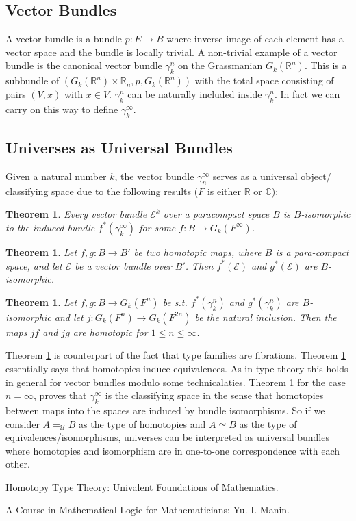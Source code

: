 \documentclass[10pt]{article}
\theoremstyle{definition}
\theoremstyle{plain}
\newtheorem{theorem}[definition]{Theorem}
\theoremstyle{remark}
\newcommand{\U}{\mathscr{U}}
\begin{document}
\subsection{Vector Bundles}
A vector bundle is a bundle $p : E \to B$ where inverse image of each element has a 
vector space and the bundle is locally trivial. A non-trivial example of a vector bundle is 
the canonical vector bundle $\gamma^n_k$ on the Grassmanian $G_k(\mathbb{R}^n)$. This is a 
subbundle of $(G_k(\mathbb{R}^n) \times \mathbb{R}_n,p,G_k(\mathbb{R}^n))$ with the total
space consisting of pairs $(V,x)$ with $x\in V$. $\gamma^n_k$ can be naturally included 
inside $\gamma^n_k$. In fact we can carry on this way to define $\gamma^{\infty}_k$. 

\subsection{Universes as Universal Bundles}

Given a natural number $k$, the vector bundle $\gamma^{\infty }_n$ serves as a universal object/
classifying space due to the following results ($F$ is either $\mathbb{R}$ or $\mathbb{C}$):

\begin{theorem}\label{T:Ind}
Every vector bundle $\mathscr{E}^k$ over a paracompact space $B$ is $B$-isomorphic
to the induced bundle $f^*(\gamma^{\infty}_k)$ for some ${f : B \to G_k (F^{ \infty })}$.
\end{theorem}

\begin{theorem}\label{T:Hom to Eq}
Let $f, g: B \to B'$ be two homotopic maps, where $B$ is a para-compact space, 
and let $\mathscr{E}$ be a vector bundle over $B'$. Then $f^*(\mathscr{E})$ and 
$g^*(\mathscr{E})$ are $B$-isomorphic.
\end{theorem}

\begin{theorem}\label{T:Eq to Hom}
Let $f, g: B \to G_k(F^n)$ be s.t. $f^*(\gamma_k^n)$ and $g^*(\gamma_k^n)$
are $B$-isomorphic and let ${ j: G_k(F^n) \to G_k(F^{2n}) }$ be the natural inclusion. Then the
maps $jf$ and $jg$ are homotopic for $1 \leq n \leq \infty$. 
\end{theorem}

Theorem \ref{T:Ind} is counterpart of the fact that type families are fibrations. Theorem
\ref{T:Hom to Eq} essentially says that homotopies induce equivalences. As in type theory
this holds in general for vector bundles modulo some technicalaties. Theorem \ref{T:Eq to Hom}
for the case $n = \infty$, proves that $\gamma^{\infty}_k$ is the classifying space in the 
sense that homotopies between maps into the spaces are induced by bundle isomorphisms.
So if we consider $A =_{\U} B$ as the type of homotopies and $A \simeq B$ as the type of
equivalences/isomorphisms, universes can be interpreted as universal bundles where homotopies
and isomorphism are in one-to-one correspondence with each other.
 


\begin{thebibliography}{99}

Homotopy Type Theory: Univalent Foundations of Mathematics.

A Course in Mathematical Logic for Mathematicians: Yu. I. Manin. 

\end{thebibliography}
\end{document}
